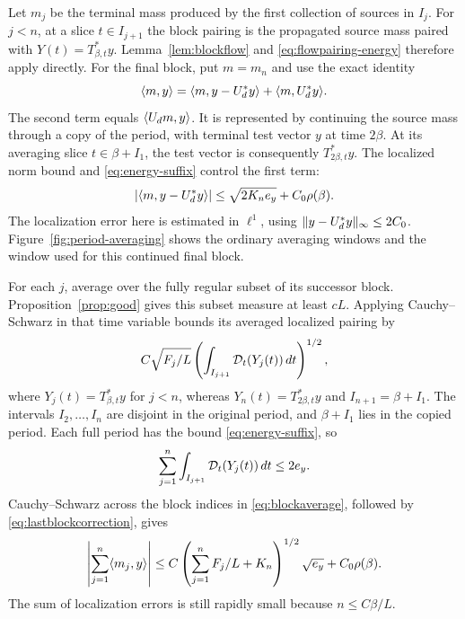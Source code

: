 Let \(m_j\) be the terminal mass produced by the first collection of
sources in \(I_j\).  For \(j<n\), at a slice \(t\in I_{j+1}\)
the block pairing is the propagated source mass paired with
\(Y(t)=T_{\beta,t}^*y\).  Lemma~\ref{lem:blockflow} and
\eqref{eq:flowpairing-energy} therefore apply directly.
For the final block, put \(m=m_n\) and use the exact identity
\begin{equation}\label{eq:lastblockcopy}
 \langle m,y\rangle
 =\langle m,y-U_d^*y\rangle+\langle m,U_d^*y\rangle.
\end{equation}
The second term equals \(\langle U_dm,y\rangle\).  It is represented by
continuing the source mass through a copy of the period, with
terminal test vector \(y\) at time \(2\beta\).  At its averaging
slice \(t\in\beta+I_1\), the test vector is consequently
\(T_{2\beta,t}^*y\).  The localized norm bound and
\eqref{eq:energy-suffix} control the first term:
\begin{equation}\label{eq:lastblockcorrection}
 \lvert \langle m,y-U_d^*y\rangle\rvert
 \le \sqrt{2K_ne_y}+C_0\rho(\beta).
\end{equation}
The localization error here is estimated in \(\ell^1\), using
\(\lVert y-U_d^*y\rVert_\infty\le2C_0\).
Figure~\ref{fig:period-averaging} shows the ordinary averaging windows
and the window used for this continued final block.


For each \(j\), average over the fully regular subset of its
successor block.  Proposition~\ref{prop:good} gives this subset
measure at least \(cL\).  Applying Cauchy--Schwarz in that time
variable bounds its averaged localized pairing by
\begin{equation}\label{eq:blockaverage}
 C\sqrt{F_j/L}
 \left(\int_{I_{j+1}}\mathcal D_t(Y_j(t))\,dt\right)^{1/2},
\end{equation}
where \(Y_j(t)=T_{\beta,t}^*y\) for \(j<n\), whereas
\(Y_n(t)=T_{2\beta,t}^*y\) and \(I_{n+1}=\beta+I_1\).
The intervals \(I_2,\ldots,I_n\) are disjoint in the original
period, and \(\beta+I_1\) lies in the copied period.  Each full
period has the bound \eqref{eq:energy-suffix}, so
\[
 \sum_{j=1}^n\int_{I_{j+1}}\mathcal D_t(Y_j(t))\,dt\le2e_y.
\]
Cauchy--Schwarz across the block indices in
\eqref{eq:blockaverage}, followed by \eqref{eq:lastblockcorrection},
gives
\begin{equation}\label{eq:smoothdualcoefficient}
 \left|\sum_{j=1}^n\langle m_j,y\rangle\right|
 \le C\left(\sum_{j=1}^nF_j/L+K_n\right)^{1/2}\sqrt{e_y}
       +C_0\rho(\beta).
\end{equation}
The sum of localization errors is still rapidly small because
\(n\le C\beta/L\).


